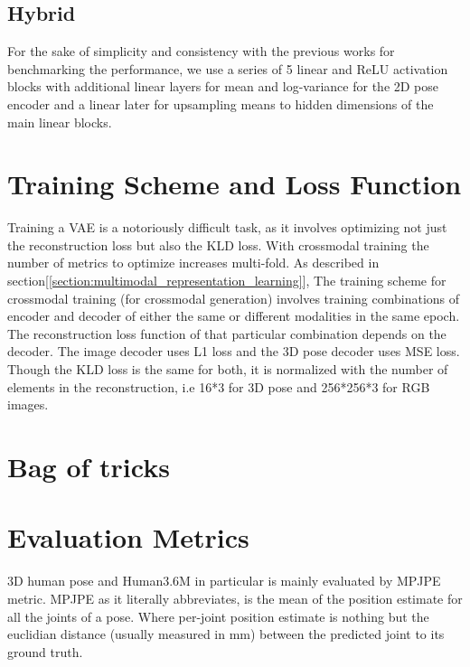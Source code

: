 \subsection{Hybrid} %
For the sake of simplicity and consistency with the previous works for benchmarking the performance, we use a series of 5 linear and ReLU activation blocks with additional linear layers for mean and log-variance for the 2D pose encoder and a linear later for upsampling means to hidden dimensions of the main linear blocks.

\section{Training Scheme and Loss Function} %
Training a \ac{VAE} is a notoriously difficult task, as it involves optimizing not just the reconstruction loss but also the \ac{KLD} loss. With crossmodal training the number of metrics to optimize increases multi-fold. As described in section[\ref{section:multimodal_representation_learning}], The training scheme for crossmodal training (for crossmodal generation) involves training combinations of encoder and decoder of either the same or different modalities in the same epoch. The reconstruction loss function of that particular combination depends on the decoder. The image decoder uses \ac{L1} loss and the 3D pose decoder uses \ac{MSE} loss. Though the \ac{KLD} loss is the same for both, it is normalized with the number of elements in the reconstruction, i.e 16*3 for 3D pose and 256*256*3 for RGB images.

\section{Bag of tricks} %
\lipsum[1-10] %

\section{Evaluation Metrics} %
3D human pose and Human3.6M in particular is mainly evaluated by \ac{MPJPE} metric. MPJPE as it literally abbreviates, is the mean of the position estimate for all the joints of a pose. Where per-joint position estimate is nothing but the euclidian distance (usually measured in mm) between the predicted joint to its ground truth.
